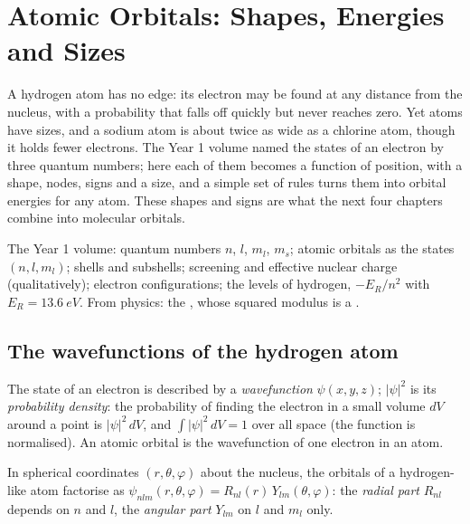 \chapter{Atomic Orbitals: Shapes, Energies and Sizes}\label{ch:b2:atomic-orbitals}

A hydrogen atom has no edge: its electron may be found at any distance from
the nucleus, with a probability that falls off quickly but never reaches
zero. Yet atoms have sizes, and a sodium atom is about twice as wide as a
chlorine atom, though it holds fewer electrons. The Year 1 volume named the
states of an electron by three quantum numbers; here each of them becomes a
function of position, with a shape, nodes, signs and a size, and a simple set
of rules turns them into orbital energies for any atom. These shapes and signs
are what the next four chapters combine into molecular orbitals.

\begin{recall}
The Year 1 volume: quantum numbers $n$, $l$, $m_l$, $m_s$; atomic orbitals as the
states $(n, l, m_l)$; shells and subshells; screening and effective nuclear
charge (qualitatively); electron configurations; the levels of hydrogen,
$-E_R/n^2$ with $E_R = \qty{13.6}{eV}$. From physics: the , whose
squared modulus is a .
\end{recall}

\section{The wavefunctions of the hydrogen atom}

\begin{definition}[Wavefunction]\label{def:b2:atomic-orbitals:wavefunction}
The state of an electron is described by a \emph{wavefunction}
$\psi(x, y, z)$; $|\psi|^2$ is its \emph{probability density}:
the probability of finding the electron in a small volume $dV$ around
a point is $|\psi|^2\,dV$, and $\int|\psi|^2\,dV = 1$ over all space (the function
is normalised). An atomic orbital is the wavefunction of one electron in an
atom.
\end{definition}

\begin{definition}\label{def:b2:atomic-orbitals:radial-angular}
In spherical coordinates $(r, \theta, \varphi)$ about the nucleus, the orbitals of
a hydrogen-like atom factorise as $\psi_{nlm}(r, \theta, \varphi) = R_{nl}(r)\,
Y_{lm}(\theta, \varphi)$: the \emph{radial part} $R_{nl}$ depends
on $n$ and $l$, the \emph{angular part} $Y_{lm}$ on $l$ and
$m_l$ only.
\end{definition}

